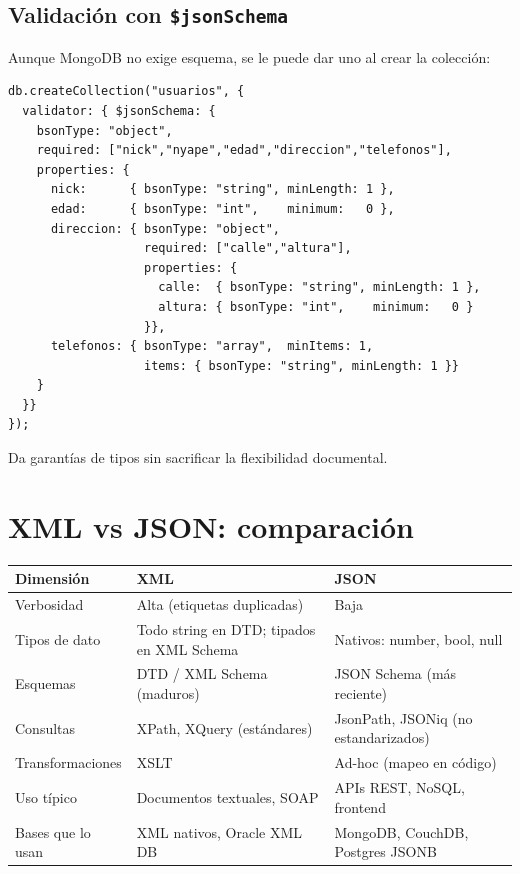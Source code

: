 \documentclass[11pt,a4paper]{article}
\begin{document}
\subsection{Validación con \texttt{\$jsonSchema}}

Aunque MongoDB no exige esquema, se le puede dar uno al crear la
colección:

\begin{lstlisting}
db.createCollection("usuarios", {
  validator: { $jsonSchema: {
    bsonType: "object",
    required: ["nick","nyape","edad","direccion","telefonos"],
    properties: {
      nick:      { bsonType: "string", minLength: 1 },
      edad:      { bsonType: "int",    minimum:   0 },
      direccion: { bsonType: "object",
                   required: ["calle","altura"],
                   properties: {
                     calle:  { bsonType: "string", minLength: 1 },
                     altura: { bsonType: "int",    minimum:   0 }
                   }},
      telefonos: { bsonType: "array",  minItems: 1,
                   items: { bsonType: "string", minLength: 1 }}
    }
  }}
});
\end{lstlisting}

Da garantías de tipos sin sacrificar la flexibilidad documental.

\section{XML vs JSON: comparación}

\begin{center}
\begin{tabular}{lll}
\toprule
Dimensión & XML & JSON \\
\midrule
Verbosidad         & Alta (etiquetas duplicadas)     & Baja \\
Tipos de dato      & Todo string en DTD; tipados en XML Schema & Nativos: number, bool, null \\
Esquemas           & DTD / XML Schema (maduros)      & JSON Schema (más reciente) \\
Consultas          & XPath, XQuery (estándares)      & JsonPath, JSONiq (no estandarizados) \\
Transformaciones   & XSLT                             & Ad-hoc (mapeo en código) \\
Uso típico         & Documentos textuales, SOAP       & APIs REST, NoSQL, frontend \\
Bases que lo usan  & XML nativos, Oracle XML DB       & MongoDB, CouchDB, Postgres JSONB \\
\bottomrule
\end{tabular}
\end{center}
\end{document}
